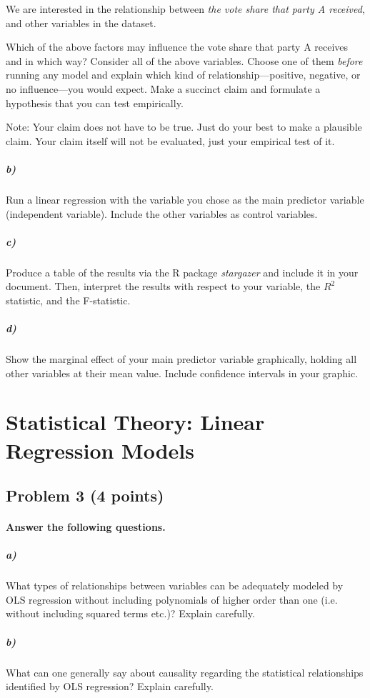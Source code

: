 \documentclass[12pt]{article}
\begin{document}
We are interested in the relationship between \textit{the vote share that party A received}, and other variables in the dataset.

Which of the above factors may influence the vote share that party A receives and in which way? Consider all of the above variables. Choose one of them \textit{before} running any model and explain which kind of relationship---positive, negative, or no influence---you would expect. Make a succinct claim and formulate a hypothesis that you can test empirically.

Note: Your claim does not have to be true. Just do your best to make a plausible claim. Your claim itself will not be evaluated, just your empirical test of it.

\subparagraph{b)} Run a linear regression with the variable you chose as the main predictor variable (independent variable). Include the other variables as control variables.

\subparagraph{c)} Produce a table of the results via the R package \textit{stargazer} and include it in your document. Then, interpret the results with respect to your variable, the $R^2$ statistic, and the F-statistic.

\subparagraph{d)} Show the marginal effect of your main predictor variable graphically, holding all other variables at their mean value. Include confidence intervals in your graphic.



\section*{Statistical Theory: Linear Regression Models}

\subsection*{Problem 3 (4 points)}

\paragraph{Answer the following questions.}

\subparagraph{a)} What types of relationships between variables can be adequately modeled by OLS regression without including polynomials of higher order than one (i.e. without including squared terms etc.)? Explain carefully.

\subparagraph{b)} What can one generally say about causality regarding the statistical relationships identified by OLS regression? Explain carefully.
\end{document}
